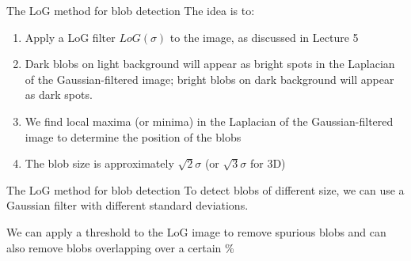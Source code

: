 \documentclass[9pt, aspectratio=169]{beamer}
\begin{document}
\begin{frame}
    {The LoG method for blob detection}
    The idea is to:

    \begin{enumerate}
        \item Apply a LoG filter $LoG(\sigma)$ to the image, as discussed in Lecture 5
        \item Dark blobs on light background will appear as bright spots in the Laplacian of the Gaussian-filtered image; bright blobs on dark background will appear as dark spots.
              \pause
        \item We find local maxima (or minima) in the Laplacian of the Gaussian-filtered image to determine the position of the blobs
        \item The blob size is approximately $\sqrt{2}\sigma$ (or $\sqrt{3}\sigma$ for 3D)
    \end{enumerate}
\end{frame}

\begin{frame}
    {The LoG method for blob detection}
    To detect blobs of different size, we can use a Gaussian filter with different standard deviations.

    We can apply a threshold to the LoG image to remove spurious blobs and can also remove blobs overlapping over a certain \%


\end{frame}
\end{document}
